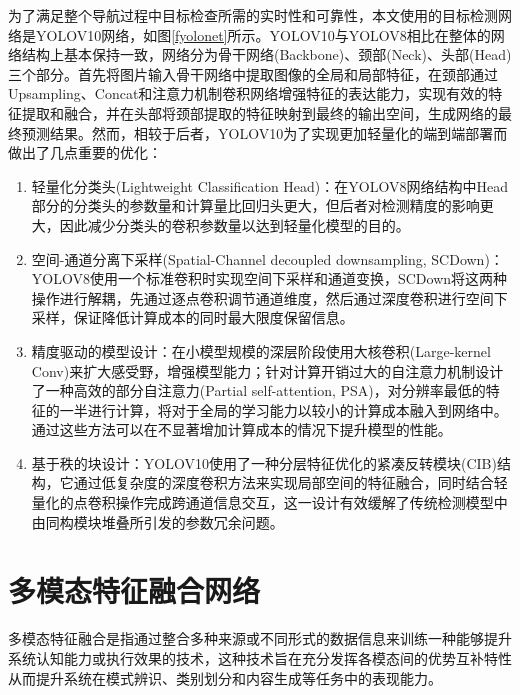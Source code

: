 为了满足整个导航过程中目标检查所需的实时性和可靠性，本文使用的目标检测网络是YOLOV10网络\cite{wang2025yolov10}，如图\ref{fyolonet}所示。YOLOV10与YOLOV8\cite{varghese2024yolov8}相比在整体的网络结构上基本保持一致，网络分为骨干网络(Backbone)、颈部(Neck)、头部(Head)三个部分。首先将图片输入骨干网络中提取图像的全局和局部特征，在颈部通过Upsampling、Concat和注意力机制卷积网络增强特征的表达能力，实现有效的特征提取和融合，并在头部将颈部提取的特征映射到最终的输出空间，生成网络的最终预测结果。然而，相较于后者，YOLOV10为了实现更加轻量化的端到端部署而做出了几点重要的优化：
\begin{enumerate}[topsep = 0 pt, itemsep= 0 pt, parsep=0pt, partopsep=0pt, leftmargin=44pt, itemindent=0pt, labelsep=6pt, label=(\arabic*)]
    \item 	轻量化分类头(Lightweight Classification Head)：在YOLOV8网络结构中Head部分的分类头的参数量和计算量比回归头更大，但后者对检测精度的影响更大，因此减少分类头的卷积参数量以达到轻量化模型的目的。
    \item	空间-通道分离下采样(Spatial-Channel decoupled downsampling, SCDown)：YOLOV8使用一个标准卷积时实现空间下采样和通道变换，SCDown将这两种操作进行解耦，先通过逐点卷积调节通道维度，然后通过深度卷积进行空间下采样，保证降低计算成本的同时最大限度保留信息。
    \item   精度驱动的模型设计：在小模型规模的深层阶段使用大核卷积(Large-kernel Conv)来扩大感受野，增强模型能力；针对计算开销过大的自注意力机制设计了一种高效的部分自注意力(Partial self-attention, PSA)，对分辨率最低的特征的一半进行计算，将对于全局的学习能力以较小的计算成本融入到网络中。通过这些方法可以在不显著增加计算成本的情况下提升模型的性能。
    \item   基于秩的块设计：YOLOV10使用了一种分层特征优化的紧凑反转模块(CIB)结构，它通过低复杂度的深度卷积方法来实现局部空间的特征融合，同时结合轻量化的点卷积操作完成跨通道信息交互，这一设计有效缓解了传统检测模型中由同构模块堆叠所引发的参数冗余问题。
\end{enumerate}


\section{多模态特征融合网络}

多模态特征融合是指通过整合多种来源或不同形式的数据信息来训练一种能够提升系统认知能力或执行效果的技术，这种技术旨在充分发挥各模态间的优势互补特性从而提升系统在模式辨识、类别划分和内容生成等任务中的表现能力。

